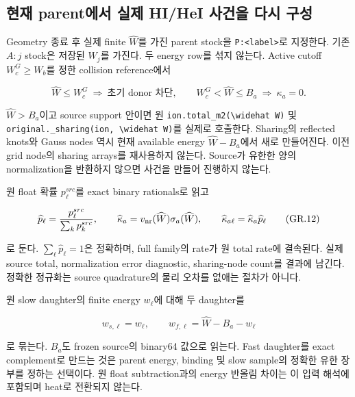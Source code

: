 \documentclass[11pt,a4paper]{article}
\begin{document}
\hypertarget{uxd604uxc7ac-parentuxc5d0uxc11c-uxc2e4uxc81c-hihei-uxc0acuxac74uxc744-uxb2e4uxc2dc-uxad6cuxc131}{%
\subsection{현재 parent에서 실제 HI/HeI 사건을 다시 구성}\label{uxd604uxc7ac-parentuxc5d0uxc11c-uxc2e4uxc81c-hihei-uxc0acuxac74uxc744-uxb2e4uxc2dc-uxad6cuxc131}}

Geometry 종료 후 실제 finite \(\widehat W\)를 가진 parent stock을 \texttt{P:\textless{}label\textgreater{}}로 지정한다. 기존 \(A:j\) stock은 저장된 \(W_j\)를 가진다. 두 energy row를 섞지 않는다. Active cutoff \(W_c^G\ge W_b\)를 정한 collision reference에서

\[
 \widehat W\le W_c^G\ \Longrightarrow\ \text{초기 donor 차단},
 \qquad
 W_c^G<\widehat W\le B_a\ \Longrightarrow\ \kappa_a=0.
\tag{GR.11}
\]

\(\widehat W>B_a\)이고 source support 안이면 원 \texttt{ion.total\_m2(\textbackslash{}widehat\ W)} 및 \nolinkurl{original._sharing(ion, \widehat W)}를 실제로 호출한다. Sharing의 reflected knots와 Gauss nodes 역시 현재 available energy \(\widehat W-B_a\)에서 새로 만들어진다. 이전 grid node의 sharing arrays를 재사용하지 않는다. Source가 유한한 양의 normalization을 반환하지 않으면 사건을 만들어 진행하지 않는다.

원 float 확률 \(p_\ell^{src}\)를 exact binary rationals로 읽고

\[
 \widehat p_\ell=\frac{p_\ell^{src}}{\sum_kp_k^{src}},\qquad
 \widehat\kappa_a=v_{\rm nr}(\widehat W)\sigma_a(\widehat W),\qquad
 \widehat\kappa_{a\ell}=\widehat\kappa_a\widehat p_\ell
\tag{GR.12}
\]

로 둔다. \(\sum_\ell\widehat p_\ell=1\)은 정확하며, full family의 rate가 원 total rate에 결속된다. 실제 source total, normalization error diagnostic, sharing-node count를 결과에 남긴다. 정확한 정규화는 source quadrature의 물리 오차를 없애는 절차가 아니다.

원 slow daughter의 finite energy \(w_\ell\)에 대해 두 daughter를

\[
 w_{s,\ell}=w_\ell,\qquad
 w_{f,\ell}=\widehat W-B_a-w_\ell
\tag{GR.13}
\]

로 묶는다. \(B_a\)도 frozen source의 binary64 값으로 읽는다. Fast daughter를 exact complement로 만드는 것은 parent energy, binding 및 slow sample의 정확한 유한 장부를 정하는 선택이다. 원 float subtraction과의 energy 반올림 차이는 이 입력 해석에 포함되며 heat로 전환되지 않는다.
\end{document}

